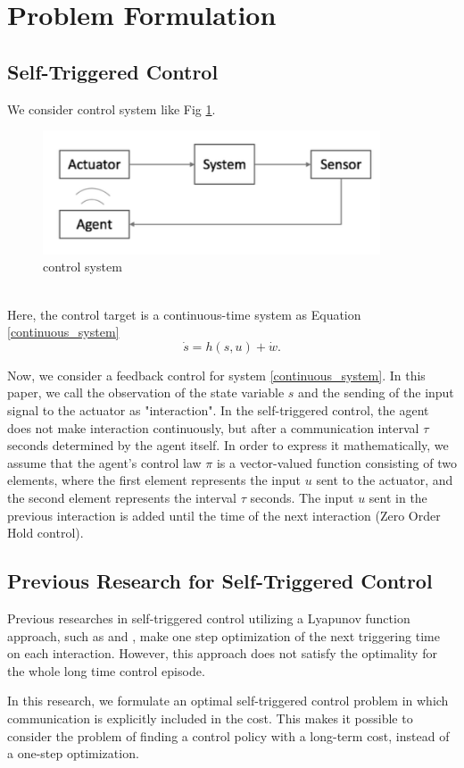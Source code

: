 \documentclass[english, dvipdfmx]{ampmt}             %
\begin{document}
\section{Problem Formulation}
\subsection{Self-Triggered Control}
We consider control system like Fig \ref{image}.
\begin{figure}[h]
	\centering
 	\includegraphics[width=10cm]{event.png}
 	\caption{control system} \label{image}
\end{figure}\\
Here, the control target is a continuous-time system as Equation \eqref{continuous_system}
\begin{equation}
	\dot{s} = h(s,u) + \dot{w}\label{continuous_system}.
\end{equation}\par
Now, we consider a feedback control for system \eqref{continuous_system}. In this paper, we call the observation of the state variable $s$ and the sending of the input signal to the actuator as "interaction". In the self-triggered control, the agent does not make interaction continuously, but after a communication interval $\tau$ seconds determined by the agent itself. In order to express it mathematically, we assume that the agent's control law $\pi$ is a vector-valued function consisting of two elements, where the first element represents the input $u$ sent to the actuator, and the second element represents the interval $\tau$ seconds. The input $u$ sent in the previous interaction is added until the time of the next interaction (Zero Order Hold control).

\subsection{Previous Research for Self-Triggered Control}
Previous researches in self-triggered control utilizing a Lyapunov function approach, such as \cite{STC} and \cite{ECBF}, make one step optimization of the next triggering time on each interaction.  However, this approach does not satisfy the optimality for the whole long time control episode. \par
In this research, we formulate an optimal self-triggered control problem in which communication is explicitly included in the cost. This makes it possible to consider the problem of finding a control policy with a long-term cost, instead of a one-step optimization.
\end{document}
